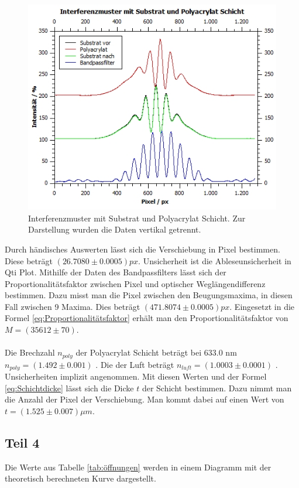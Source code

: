 \documentclass[12pt,a4paper,twoside]{article}
\begin{document}
\begin{figure}[H]
    \centering
    \includegraphics[width=0.7\linewidth]{nudes/aufgabe 3 plot.jpg}
    \caption{Interferenzmuster mit Substrat und Polyacrylat Schicht. Zur Darstellung wurden die Daten vertikal getrennt.}
    \label{fig:aufgabe 3 Interferenzmuster}
\end{figure}

\noindent
Durch händisches Auswerten lässt sich die Verschiebung in Pixel bestimmen. Diese beträgt $(26.7080 \pm 0.0005)px$. Unsicherheit ist die Ableseunsicherheit in Qti Plot. 
Mithilfe der Daten des Bandpassfilters lässt sich der Proportionalitätsfaktor zwischen Pixel und optischer Weglängendifferenz bestimmen. Dazu misst man die Pixel zwischen den Beugungsmaxima, in diesen Fall zwischen 9 Maxima. Dies beträgt $(471.8074 \pm 0.0005)px$. 
Eingesetzt in die Formel \ref{eq:Proportionalitätsfaktor} erhält man den Proportionalitätsfaktor von $M=(35612 \pm 70)$. 
\\
\\
Die Brechzahl $n_{poly}$ der Polyacrylat Schicht beträgt bei 633.0 nm $n_{poly} = (1.492 \pm 0.001)$ \cite{teachcenter2}. Die der Luft beträgt $n_{luft} = (1.0003 \pm 0.0001)$ \cite{wiki1}.  Unsicherheiten implizit angenommen. 
Mit diesen Werten und der Formel \ref{eq:Schichtdicke} lässt sich die Dicke $t$ der Schicht bestimmen. 
Dazu nimmt man die Anzahl der Pixel der Verschiebung. Man kommt dabei auf einen Wert von $t = (1.525 \pm 0.007)\mu m$. 

\subsection{Teil 4}
Die Werte aus Tabelle \ref{tab:öffnungen} werden in einem Diagramm mit der theoretisch berechneten Kurve dargestellt. 
\end{document}
